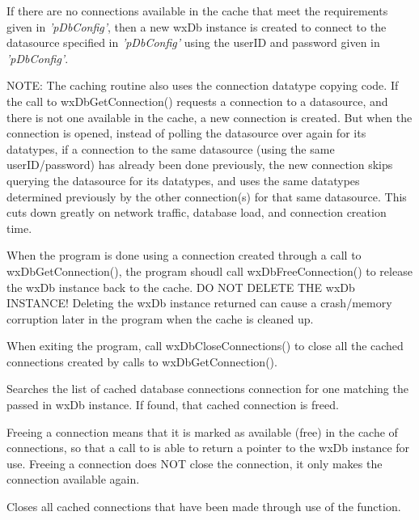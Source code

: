 If there are no connections available in the cache that meet the requirements 
given in {\it'pDbConfig'}, then a new wxDb instance is created to connect 
to the datasource specified in {\it'pDbConfig'} using the userID and password 
given in {\it'pDbConfig'}.

NOTE: The caching routine also uses the  
connection datatype copying code.  If the call to wxDbGetConnection() 
requests a connection to a datasource, and there is not one available in the 
cache, a new connection is created.  But when the connection is opened, 
instead of polling the datasource over again for its datatypes, if a 
connection to the same datasource (using the same userID/password) has already 
been done previously, the new connection skips querying the datasource for 
its datatypes, and uses the same datatypes determined previously by the 
other connection(s) for that same datasource.  This cuts down greatly on 
network traffic, database load, and connection creation time.

When the program is done using a connection created through a call to 
wxDbGetConnection(), the program shoudl call wxDbFreeConnection() to release 
the wxDb instance back to the cache.  DO NOT DELETE THE wxDb INSTANCE!  
Deleting the wxDb instance returned can cause a crash/memory corruption 
later in the program when the cache is cleaned up.

When exiting the program, call wxDbCloseConnections() to close all the 
cached connections created by calls to wxDbGetConnection().




Searches the list of cached database connections connection for one matching 
the passed in wxDb instance.  If found, that cached connection is freed.

Freeing a connection means that it is marked as available (free) in the 
cache of connections, so that a call to  
is able to return a pointer to the wxDb instance for use.  Freeing a 
connection does NOT close the connection, it only makes the connection 
available again.
 



Closes all cached connections that have been made through use of the 
 function.  

